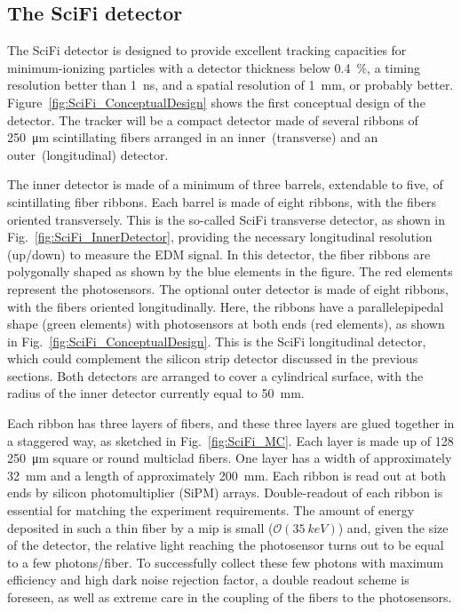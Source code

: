 \begin{refsection}
\subsection{The SciFi detector}
    The SciFi detector is designed to provide excellent tracking capacities for minimum-ionizing particles with a detector thickness below \SI{0.4}{\%}, a timing resolution better than \SI{1}{ns}, and a spatial resolution of \SI{1}{mm}, or probably better.
    Figure~\ref{fig:SciFi_ConceptualDesign} shows the first conceptual design of the detector. The tracker will be a compact detector made of several ribbons of \SI{250}{\micro m} scintillating fibers arranged in an inner~(transverse) and an outer~(longitudinal) detector.

The inner detector is made of a minimum of three barrels, extendable to five, of scintillating fiber ribbons. Each barrel is made of eight ribbons, with the fibers oriented transversely. This is the so-called SciFi transverse detector, as shown in Fig.~\ref{fig:SciFi_InnerDetector}, providing the necessary longitudinal resolution (up/down) to measure the EDM signal. In this detector, the fiber ribbons are polygonally shaped as shown by the blue elements in the figure. The red elements represent the photosensors. The optional outer detector is made of eight ribbons, with the fibers oriented longitudinally. Here, the ribbons have a parallelepipedal shape (green elements) with photosensors at both ends (red elements), as shown in Fig.~\ref{fig:SciFi_ConceptualDesign}. This is the SciFi longitudinal detector, which could complement the silicon strip detector discussed in the previous sections. Both detectors are arranged to cover a cylindrical surface, with the radius of the inner detector currently equal to \SI{50}{mm}.

Each ribbon has three layers of fibers, and these three layers are glued together in a staggered way, as sketched in Fig.~\ref{fig:SciFi_MC}. Each layer is made up of 128 \SI{250}{\micro m} square or round multiclad fibers. One layer has a width of approximately \SI{32}{mm} and a length of approximately \SI{200}{mm}. Each ribbon is read out at both ends by silicon photomultiplier (SiPM) arrays. Double-readout of each ribbon is essential for matching the experiment requirements. The amount of energy deposited in such a thin fiber by a mip is small ($\mathcal{O}(\SI{35}{keV})$) and, given the size of the detector, the relative light reaching the photosensor turns out to be equal to a few photons/fiber. 
To successfully collect these few photons with maximum efficiency and high dark noise rejection factor, a double readout scheme is foreseen, as well as extreme care in the coupling of the fibers to the photosensors.


\end{refsection}
